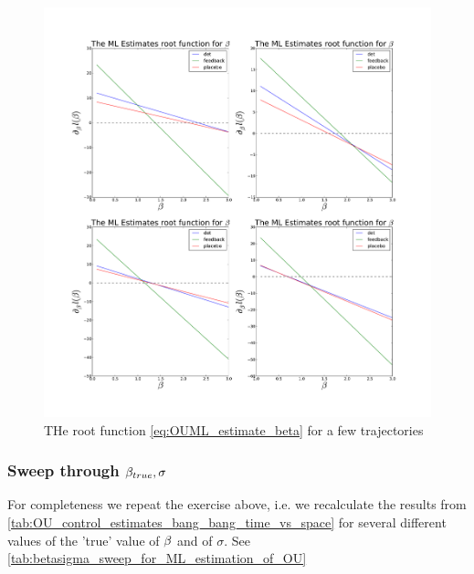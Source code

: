 \documentclass{article}
\begin{document}
\begin{figure}[htp]
\begin{center}
  \includegraphics[width=1\textwidth]{Figs/OU_MIControlSimulator/BetaRoot_Tf=16.pdf}
  \caption[labelInTOC]{THe root function \cref{eq:OUML_estimate_beta} for a few
  trajectories}
  \label{fig:ML_beta_root}
\end{center}
\end{figure}



\subsubsection{Sweep through ${\beta}_{true}, \sigma $}

For completeness we repeat the exercise above, i.e. we recalculate the results
from \cref{tab:OU_control_estimates_bang_bang_time_vs_space} for several
different values of the 'true' value of ${\beta}$ and of $\sigma$. See
\cref{tab:betasigma_sweep_for_ML_estimation_of_OU}
\end{document}
